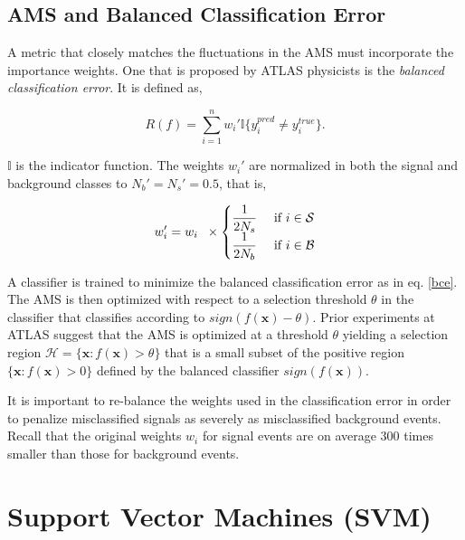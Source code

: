 \documentclass[final,3p,times,twocolumn]{elsarticle}
\begin{document}
\subsection{AMS and Balanced Classification Error}
\label{AMSbce}
A metric that closely matches the fluctuations in the AMS must incorporate the importance weights. One that is proposed by ATLAS physicists is the \textit{balanced classification error}. It is defined as, 

\begin{equation} 
R(f) = \sum_{i=1}^{n}w_{i}'\mathbb{I}\{y_{i}^{pred} \neq y_{i}^{true}\}. 
\label{bce}
\end{equation}

$\mathbb{I}$ is the indicator function. The weights $w_{i}'$ are normalized in both the signal and background classes to $N_{b}' = N_{s}' = 0.5$, that is, 

\begin{equation}
w_{i}' = w_{i}  \hspace{2mm} \times 
\begin{cases}
\dfrac{1}{2N_{s}} & \textrm{ if } i \in \mathcal{S} \\
\dfrac{1}{2N_{b}} & \textrm{ if } i \in \mathcal{B} 
\end{cases}
\end{equation}
 
A classifier is trained to minimize the balanced classification error as in eq. \ref{bce}. The AMS is then optimized with respect to a selection threshold $\theta$ in the classifier that classifies according to $sign(f(\textbf{x}) - \theta)$. Prior experiments at ATLAS suggest that the AMS is optimized at a threshold $\theta$ yielding a selection region $\mathcal{H} = \{ \textbf{x} : f(\textbf{x}) > \theta \}$ that is a small subset of the positive region $\{ \textbf{x} : f(\textbf{x}) > 0\}$ defined by the balanced classifier $sign(f(\textbf{x}))$.

It is important to re-balance the weights used in the classification error in order to penalize misclassified signals as severely as misclassified background events. Recall that the original weights $w_{i}$ for signal events are on average 300 times smaller than those for background events. %

\section{Support Vector Machines (SVM)}
\label{SVM}
\end{document}

